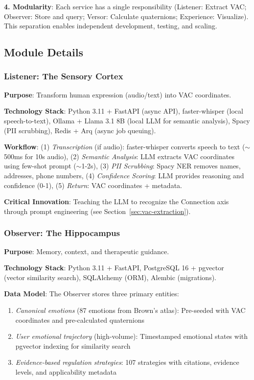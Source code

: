 \textbf{4. Modularity}: Each service has a single responsibility (Listener: Extract VAC; Observer: Store and query; Versor: Calculate quaternions; Experience: Visualize). This separation enables independent development, testing, and scaling.

\subsection{Module Details}

\subsubsection{Listener: The Sensory Cortex}

\textbf{Purpose}: Transform human expression (audio/text) into VAC coordinates.

\textbf{Technology Stack}: Python 3.11 + FastAPI (async API), faster-whisper (local speech-to-text), Ollama + Llama 3.1 8B (local LLM for semantic analysis), Spacy (PII scrubbing), Redis + Arq (async job queuing).

\textbf{Workflow}: (1) \textit{Transcription} (if audio): faster-whisper converts speech to text ($\sim$500ms for 10s audio), (2) \textit{Semantic Analysis}: LLM extracts VAC coordinates using few-shot prompt ($\sim$1-2s), (3) \textit{PII Scrubbing}: Spacy NER removes names, addresses, phone numbers, (4) \textit{Confidence Scoring}: LLM provides reasoning and confidence (0-1), (5) \textit{Return}: VAC coordinates + metadata.

\textbf{Critical Innovation}: Teaching the LLM to recognize the Connection axis through prompt engineering (see Section~\ref{sec:vac-extraction}).

\subsubsection{Observer: The Hippocampus}

\textbf{Purpose}: Memory, context, and therapeutic guidance.

\textbf{Technology Stack}: Python 3.11 + FastAPI, PostgreSQL 16 + pgvector~\cite{pgvector2023} (vector similarity search), SQLAlchemy (ORM), Alembic (migrations).

\textbf{Data Model}: The Observer stores three primary entities:

\begin{enumerate}
    \item \textit{Canonical emotions} (87 emotions from Brown's atlas): Pre-seeded with VAC coordinates and pre-calculated quaternions
    \item \textit{User emotional trajectory} (high-volume): Timestamped emotional states with pgvector indexing for similarity search
    \item \textit{Evidence-based regulation strategies}: 107 strategies with citations, evidence levels, and applicability metadata
\end{enumerate}

